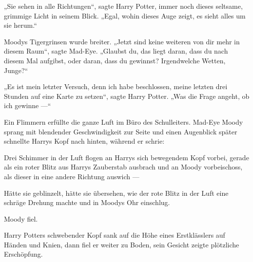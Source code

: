„Sie sehen in alle Richtungen“, sagte Harry Potter, immer noch dieses seltsame, grimmige Licht in seinem Blick.
„Egal, wohin dieses Auge zeigt, es sieht alles um sie herum.“

Moodys Tigergrinsen wurde breiter.
„Jetzt sind keine weiteren von dir mehr in diesem Raum“, sagte Mad-Eye.
„Glaubst du, das liegt daran, dass du nach diesem Mal aufgibst, oder daran, dass du gewinnst? Irgendwelche Wetten, Junge?“

„Es ist mein letzter Versuch, denn ich habe beschlossen, meine letzten drei Stunden auf eine Karte zu setzen“, sagte Harry Potter.
„Was die Frage angeht, ob ich gewinne —“

Ein Flimmern erfüllte die ganze Luft im Büro des Schulleiters. Mad-Eye Moody sprang mit blendender Geschwindigkeit zur Seite und einen Augenblick später schnellte Harrys Kopf nach hinten, während er schrie: 

Drei Schimmer in der Luft flogen an Harrys sich bewegendem Kopf vorbei, gerade als ein roter Blitz aus Harrys Zauberstab ausbrach und an Moody vorbeischoss, als dieser in eine andere Richtung auswich —

Hätte sie geblinzelt, hätte sie übersehen, wie der rote Blitz in der Luft eine schräge Drehung machte und in Moodys Ohr einschlug.

Moody fiel.

Harry Potters schwebender Kopf sank auf die Höhe eines Erstklässlers auf Händen und Knien, dann fiel er weiter zu Boden, sein Gesicht zeigte plötzliche Erschöpfung.

